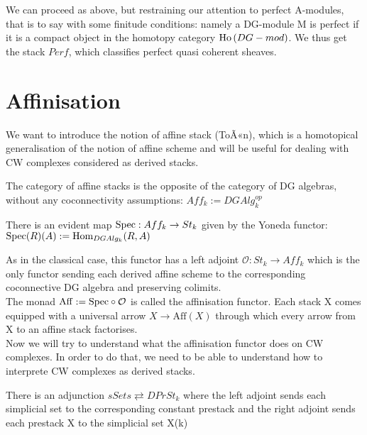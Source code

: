 \begin{refsection}
\begin{defin}
We can proceed as above, but restraining our attention to perfect A-modules, that is to say with some finitude conditions: namely a DG-module M is perfect if it is a compact object
in the homotopy category $\mathrm{Ho} \,(DG-mod)$. We thus get the stack $Perf$, which classifies perfect quasi coherent sheaves.
\end{defin}

\section{Affinisation}

We want to introduce the notion of affine stack (ToÃ«n), which is a homotopical generalisation of the notion of affine scheme and will be useful for dealing
with CW complexes considered as derived stacks.\\
\begin{defin}
The category of affine stacks is the opposite of the category of DG algebras, without any coconnectivity assumptions: $Aff_k:=DGAlg_k^{op}$
\end{defin}

\begin{rmk}
There is an evident map $\mathrm{Spec}: Aff_k \to St_k $ given by the Yoneda functor: $\mathrm{Spec}(R)(A):=\mathrm{Hom}_{DGAlg_k}(R,A)$
\end{rmk}

As in the classical case, this functor has a left adjoint $\mathcal O: St_k \to Aff_k$ which is the only functor sending each derived affine scheme to the corresponding coconnective
DG algebra and preserving colimits.\\
The monad $\mathrm{Aff}:= \mathrm{Spec}\circ\mathcal O$ is called the affinisation functor. Each stack X comes equipped with a universal arrow $X\to\mathrm{Aff}(X)$ through which every arrow
from X to an affine stack factorises.\\

Now we will try to understand what the affinisation functor does on CW complexes. In order to do that, we need to be able to understand how to interprete
CW complexes as derived stacks.\\
\begin{prop}
There is an adjunction $sSets \rightleftarrows DPrSt_k$ where the left adjoint sends each simplicial set 
to the corresponding constant prestack and the right adjoint sends each prestack X to the simplicial set X(k)
\end{prop}


\end{refsection}
